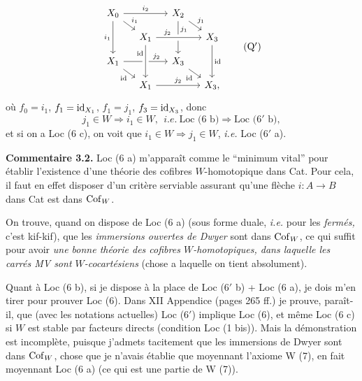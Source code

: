 \noindent{}
\[
\begin{tikzcd}[ampersand replacement=\&, row sep=small, column sep=small]
X_0 \arrow[rr, "i_2"] \arrow[dr, "i_1"] \arrow[dd, "i_1"'] \& \& X_2 \arrow[dr, "j_1"] \arrow[dd, "j_1" near start] \& \\
\& X_1 \arrow[rr, "j_2" near start, crossing over] \& \& X_3 \arrow[dd, "\id"] \\
X_1 \arrow[rr, "j_2" near end] \arrow[dr, "\id"'] \& \& X_3 \arrow[dr, "\id"'] \& \\
\& X_1 \arrow[rr, "j_2"] \arrow[from=2-2, "\id"' near start, crossing over] \& \& X_3,
\end{tikzcd}
\tag*{(Q$'$)} %
\]
où $f_0 = i_1$, $f_1 = \mathrm{id}_{X_1}$, $f_1 = j_1$, $f_3 = \mathrm{id}_{X_3}$, donc %
\[
j_1 \in W \Longrightarrow i_1 \in W, \ \ \textit{i.e.}\ \text{Loc (6 b)} \Longrightarrow \text{Loc (6$'$ b)},
\]
et si on a Loc (6 c), on voit que $i_1 \in W \Longrightarrow j_1 \in W$, \textit{i.e.} Loc (6$'$ a).

\textbf{Commentaire 3.2.} Loc (6 a) m'apparaît comme le “minimum vital” pour établir l'existence d'une théorie des cofibres $W$-homotopique dans Cat. Pour cela, il faut en effet disposer d'un critère serviable assurant qu'une flèche $i : A \longrightarrow B$ dans Cat est dans $\mathrm{Cof}_W$.

On trouve, quand on dispose de Loc (6 a) (sous forme duale, \textit{i.e.} pour les \textit{fermés,} c'est kif-kif), que les \textit{immersions ouvertes de Dwyer} sont dans $\mathrm{Cof}_W$, ce qui suffit pour avoir \textit{une bonne théorie des cofibres $W$-homotopiques, dans laquelle les carrés MV sont $W$-cocartésiens} (chose a laquelle on tient absolument). %

Quant à Loc (6 b), si je dispose à la place de Loc (6$'$ b) + Loc (6 a), je dois m'en tirer pour prouver Loc (6). Dans XII Appendice (pages 265 ff.) je prouve, paraît-il, que (avec les notations actuelles) Loc (6$'$) implique Loc (6), et même Loc (6 c) si $W$ est stable par facteurs directs (condition Loc (1 bis)). Mais la démonstration est incomplète, puisque j'admets tacitement que les immersions de Dwyer sont dans $\mathrm{Cof}_W$, chose que je n'avais établie que moyennant l'axiome W (7), en fait moyennant Loc (6 a) (ce qui est une partie de W (7)).

